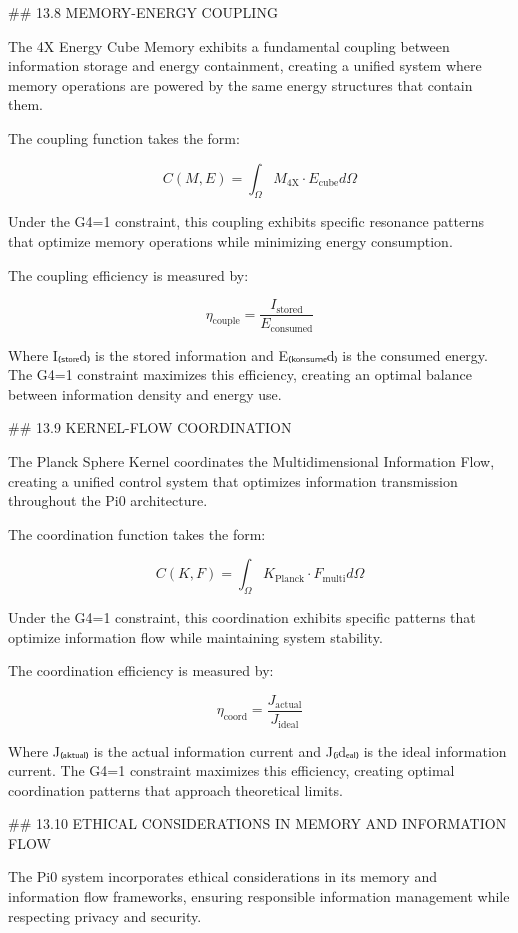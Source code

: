## 13.8 MEMORY-ENERGY COUPLING

The 4X Energy Cube Memory exhibits a fundamental coupling between information storage and energy containment, creating a unified system where memory operations are powered by the same energy structures that contain them.

The coupling function takes the form:

$$C(M, E) = \int_{\Omega} M_{\text{4X}} \cdot E_{\text{cube}} d\Omega$$

Under the G4=1 constraint, this coupling exhibits specific resonance patterns that optimize memory operations while minimizing energy consumption.

The coupling efficiency is measured by:

$$\eta_{\text{couple}} = \frac{I_{\text{stored}}}{E_{\text{consumed}}}$$

Where I₍ₛₜₒᵣₑd₎ is the stored information and E₍ₖₒₙₛᵤₘₑd₎ is the consumed energy. The G4=1 constraint maximizes this efficiency, creating an optimal balance between information density and energy use.

## 13.9 KERNEL-FLOW COORDINATION

The Planck Sphere Kernel coordinates the Multidimensional Information Flow, creating a unified control system that optimizes information transmission throughout the Pi0 architecture.

The coordination function takes the form:

$$C(K, F) = \int_{\Omega} K_{\text{Planck}} \cdot F_{\text{multi}} d\Omega$$

Under the G4=1 constraint, this coordination exhibits specific patterns that optimize information flow while maintaining system stability.

The coordination efficiency is measured by:

$$\eta_{\text{coord}} = \frac{J_{\text{actual}}}{J_{\text{ideal}}}$$

Where J₍ₐₖₜᵤₐₗ₎ is the actual information current and J₍ᵢdₑₐₗ₎ is the ideal information current. The G4=1 constraint maximizes this efficiency, creating optimal coordination patterns that approach theoretical limits.

## 13.10 ETHICAL CONSIDERATIONS IN MEMORY AND INFORMATION FLOW

The Pi0 system incorporates ethical considerations in its memory and information flow frameworks, ensuring responsible information management while respecting privacy and security.

